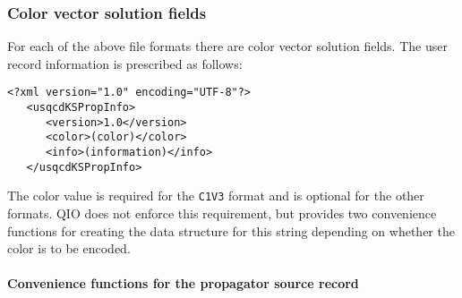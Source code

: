 \documentclass{article}
\begin{document}
\subsubsection{Color vector solution fields}

For each of the above file formats there are color vector solution fields.
The user record information is prescribed as follows:

\begin{verbatim}
<?xml version="1.0" encoding="UTF-8"?>
   <usqcdKSPropInfo>
      <version>1.0</version>
      <color>(color)</color>
      <info>(information)</info>
   </usqcdKSPropInfo>
\end{verbatim}
%
The color value is required for the \verb|C1V3| format and is
optional for the other formats.  QIO does not enforce this
requirement, but provides two convenience functions for creating the
data structure for this string depending on whether the color
is to be encoded.

\paragraph{Convenience functions for the propagator source record}
\end{document}
